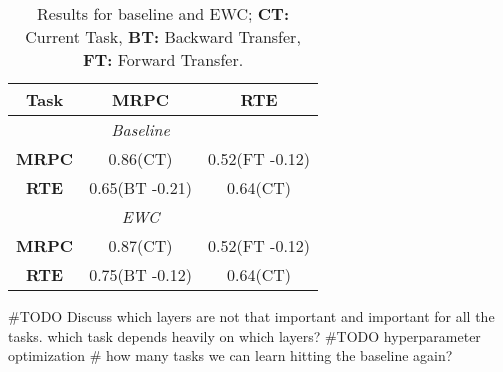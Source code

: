 \documentclass[11pt,a4paper]{article}
\begin{document}








\begin{table}[h!]
\centering
 \begin{tabular}{|c|c|c|} 
 \hline
 \textbf{Task} & \textbf{MRPC} & \textbf{RTE}  \\
 \hline\hline
 & \textit{Baseline} & \\
 \hline
 \textbf{MRPC} & 0.86(CT) & 0.52(FT -0.12) \\ 
 \hline
 \textbf{RTE} & 0.65(BT -0.21) & 0.64(CT) \\ %
 \hline
 & \textit{EWC} & \\ 
 \hline\hline
 \textbf{MRPC} & 0.87(CT) & 0.52(FT -0.12) \\ 
 \hline
 \textbf{RTE} & 0.75(BT -0.12) & 0.64(CT) \\ %
 \hline
\end{tabular}


\caption{\label{base-table} Results for baseline and EWC; \textbf{CT:} Current Task, \textbf{BT:} Backward Transfer, \textbf{FT:} Forward Transfer. 
 }
\end{table}
#TODO Discuss which layers are not that important and important for all the tasks. which task depends heavily on which layers?
#TODO hyperparameter optimization
# how many tasks we can learn hitting the baseline again?
\end{document}
